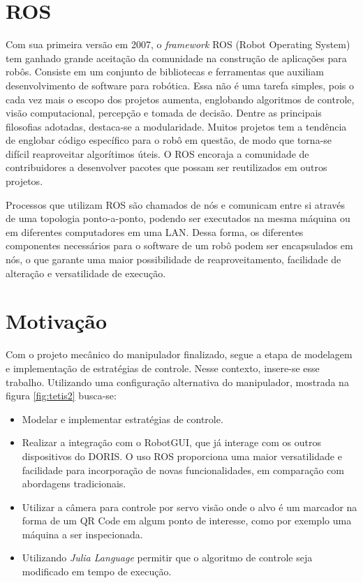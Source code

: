 \section{ROS}
Com sua primeira versão em 2007, o \textit{framework} ROS (Robot Operating System) tem ganhado grande aceitação da comunidade na construção de aplicações para robôs. Consiste em um conjunto de bibliotecas e ferramentas que auxiliam desenvolvimento de software para robótica. Essa não é uma tarefa simples, pois o cada vez mais o escopo dos projetos aumenta, englobando algoritmos de controle, visão computacional, percepção e tomada de decisão.
Dentre as principais filosofias adotadas, destaca-se a modularidade. 
Muitos projetos tem a tendência de englobar código específico para o robô em questão, de modo que torna-se difícil reaproveitar algorítimos úteis. O ROS encoraja a comunidade de contribuidores a desenvolver pacotes que possam ser reutilizados em outros projetos.  

Processos que utilizam ROS são chamados de nós e comunicam entre si através de uma topologia ponto-a-ponto, podendo ser executados na mesma máquina ou em diferentes computadores em uma LAN. Dessa forma, os diferentes componentes necessários para o software de um robô podem ser encapsulados em nós, o que garante uma maior possibilidade de reaproveitamento, facilidade de alteração e versatilidade de execução.

\section{Motivação}
Com o projeto mecânico do manipulador finalizado, segue a etapa de modelagem e implementação de estratégias de controle. 
Nesse contexto, insere-se esse trabalho. Utilizando uma configuração alternativa do manipulador, mostrada na figura \ref{fig:tetis2} busca-se:
\begin{itemize}
\item Modelar e implementar estratégias de controle. %

\item Realizar a integração com o RobotGUI, que já interage com os outros dispositivos do DORIS. O uso ROS proporciona uma maior versatilidade e facilidade para incorporação de novas funcionalidades, em comparação com abordagens tradicionais.

\item Utilizar a câmera para controle por servo visão onde o alvo é um marcador na forma de um QR Code em algum ponto de interesse, como por exemplo uma máquina a ser inspecionada. 

\item Utilizando \textit{Julia Language} permitir que o algoritmo de controle seja modificado em tempo de execução.
\end{itemize}


